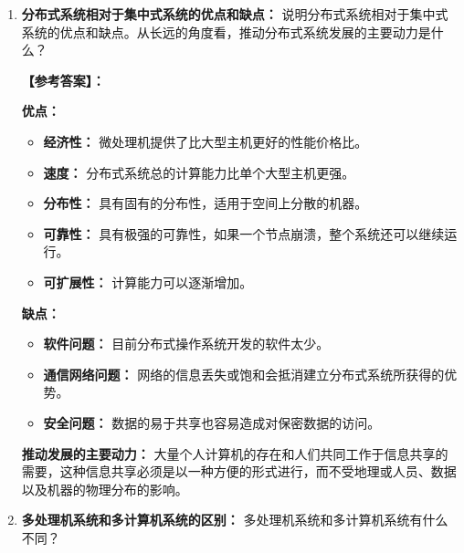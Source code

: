 \documentclass[a4paper,12pt]{article}
\newcommand{\answer}[1]{\par\vspace{0.5em}\hspace{2em}\textbf{【参考答案】：}\\{\color{blue}#1}\par\vspace{1em}}
\begin{document}
\begin{enumerate}[label=\arabic*.]
{    \textbf{原因：}
    \begin{itemize}
        \item \textbf{模块化：} 清晰划分功能，易于设计和实现。
        \item \textbf{灵活性与扩展性：} 可以独立升级客户机或服务器，易于添加新服务。
        \item \textbf{资源分离：} 适合分布式环境（如数据集中管理，界面分散处理）。
    \end{itemize}
    
    \textbf{实例：} Web服务。浏览器（客户）发送HTTP请求，Web服务器（如Apache）接收请求、处理并返回HTML页面。
    }

    \item \textbf{分布式系统相对于集中式系统的优点和缺点：}
    说明分布式系统相对于集中式系统的优点和缺点。从长远的角度看，推动分布式系统发展的主要动力是什么？
    
    \answer{
    \textbf{优点：}
    \begin{itemize}
        \item \textbf{经济性：} 微处理机提供了比大型主机更好的性能价格比。
        \item \textbf{速度：} 分布式系统总的计算能力比单个大型主机更强。
        \item \textbf{分布性：} 具有固有的分布性，适用于空间上分散的机器。
        \item \textbf{可靠性：} 具有极强的可靠性，如果一个节点崩溃，整个系统还可以继续运行。
        \item \textbf{可扩展性：} 计算能力可以逐渐增加。
    \end{itemize}
    
    \textbf{缺点：}
    \begin{itemize}
        \item \textbf{软件问题：} 目前分布式操作系统开发的软件太少。
        \item \textbf{通信网络问题：} 网络的信息丢失或饱和会抵消建立分布式系统所获得的优势。
        \item \textbf{安全问题：} 数据的易于共享也容易造成对保密数据的访问。
    \end{itemize}
    
    \textbf{推动发展的主要动力：} 大量个人计算机的存在和人们共同工作于信息共享的需要，这种信息共享必须是以一种方便的形式进行，而不受地理或人员、数据以及机器的物理分布的影响。
    }

    \item \textbf{多处理机系统和多计算机系统的区别：}
    多处理机系统和多计算机系统有什么不同？
    

\end{enumerate}
\end{document}
